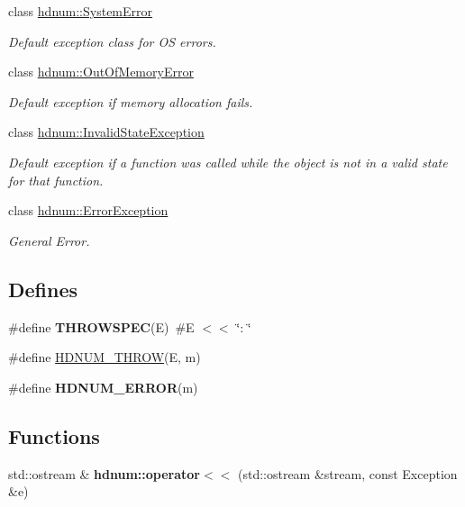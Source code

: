 \begin{DoxyCompactItemize}
class \hyperlink{classhdnum_1_1SystemError}{hdnum::SystemError}
\begin{DoxyCompactList}\small\item\em Default exception class for OS errors. \item\end{DoxyCompactList}\item 
class \hyperlink{classhdnum_1_1OutOfMemoryError}{hdnum::OutOfMemoryError}
\begin{DoxyCompactList}\small\item\em Default exception if memory allocation fails. \item\end{DoxyCompactList}\item 
class \hyperlink{classhdnum_1_1InvalidStateException}{hdnum::InvalidStateException}
\begin{DoxyCompactList}\small\item\em Default exception if a function was called while the object is not in a valid state for that function. \item\end{DoxyCompactList}\item 
class \hyperlink{classhdnum_1_1ErrorException}{hdnum::ErrorException}
\begin{DoxyCompactList}\small\item\em General Error. \item\end{DoxyCompactList}\end{DoxyCompactItemize}
\subsection*{Defines}
\begin{DoxyCompactItemize}
\item 
\hypertarget{exceptions_8hh_a3166b62636d7a133db5150ce192d0ad3}{
\#define {\bfseries THROWSPEC}(E)~\#E $<$$<$ \char`\"{}: \char`\"{}}
\label{exceptions_8hh_a3166b62636d7a133db5150ce192d0ad3}

\item 
\#define \hyperlink{exceptions_8hh_a7385bc4ca18aaff3f509a30bde2567c0}{HDNUM\_\-THROW}(E, m)
\item 
\#define {\bfseries HDNUM\_\-ERROR}(m)
\end{DoxyCompactItemize}
\subsection*{Functions}
\begin{DoxyCompactItemize}
\item 
\hypertarget{namespacehdnum_a892de125bed4e6f2dcc4a55300573e32}{
std::ostream \& {\bfseries hdnum::operator$<$$<$} (std::ostream \&stream, const Exception \&e)}
\label{namespacehdnum_a892de125bed4e6f2dcc4a55300573e32}

\end{DoxyCompactItemize}


